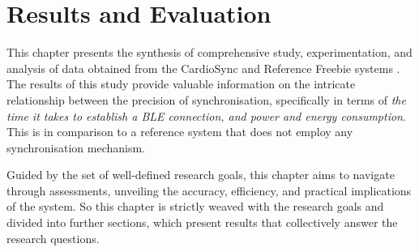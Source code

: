 \chapter{Results and Evaluation}
\label{chap:results}

This chapter presents the synthesis of comprehensive study, experimentation, and analysis of data obtained from the CardioSync and Reference Freebie systems \cite{de2022Intermittently}. The results of this study provide valuable information on the intricate relationship between the precision of synchronisation, specifically in terms of \textit{the time it takes to establish a BLE connection, and power and energy consumption}. This is in comparison to a reference system that does not employ any synchronisation mechanism. 

\noindent Guided by the set of well-defined research goals, this chapter aims to navigate through assessments, unveiling the accuracy, efficiency, and practical implications of the system. So this chapter is strictly weaved with the research goals and divided into further sections, which present results that collectively answer the research questions.


